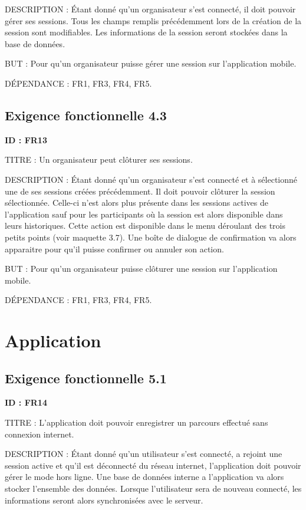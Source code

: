\documentclass[titlepage, 12pt]{report}
\begin{document}
DESCRIPTION : Étant donné qu'un organisateur s'est connecté, il doit pouvoir gérer ses sessions. Tous les champs remplis précédemment lors de la création de la session sont modifiables. Les informations de la session seront stockées dans la base de données.

BUT : Pour qu'un organisateur puisse gérer une session sur l'application mobile.

DÉPENDANCE : FR1, FR3, FR4, FR5.

\subsection{Exigence fonctionnelle 4.3}

\textbf{ID : FR13}

TITRE : Un organisateur peut clôturer ses sessions.

DESCRIPTION : Étant donné qu'un organisateur s'est connecté et à sélectionné une de ses sessions créées précédemment. Il doit pouvoir clôturer la session sélectionnée. Celle-ci n'est alors plus présente dans les sessions actives de l'application sauf pour les participants où la session est alors disponible dans leurs historiques. Cette action est disponible dans le menu déroulant des trois petits points (voir maquette 3.7). Une boîte de dialogue de confirmation va alors apparaitre pour qu'il puisse confirmer ou annuler son action.

BUT : Pour qu'un organisateur puisse clôturer une session sur l'application mobile.

DÉPENDANCE : FR1, FR3, FR4, FR5.

\section{Application}

\subsection{Exigence fonctionnelle 5.1}

\textbf{ID : FR14}

TITRE : L'application doit pouvoir enregistrer un parcours effectué sans connexion internet.

DESCRIPTION : Étant donné qu'un utilisateur s'est connecté, a rejoint une session active et qu'il est déconnecté du réseau internet, l'application doit pouvoir gérer le mode hors ligne. Une base de données interne a l'application va alors stocker l'ensemble des données. Lorsque l'utilisateur sera de nouveau connecté, les informations seront alors synchronisées avec le serveur.
\end{document}
